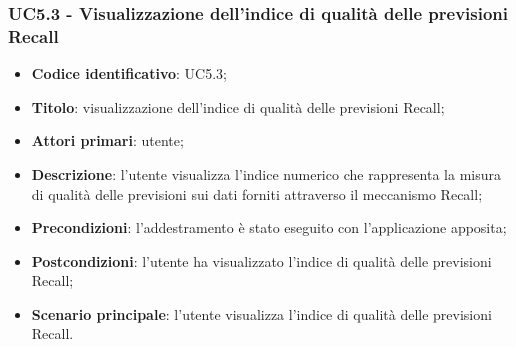 \subsubsection{UC5.3 - Visualizzazione dell'indice di qualità delle previsioni Recall}
\begin{itemize}
	\item \textbf{Codice identificativo}: UC5.3;
	\item \textbf{Titolo}: visualizzazione dell'indice di qualità delle previsioni Recall\glo;
	\item \textbf{Attori primari}: utente;
	\item \textbf{Descrizione}: l'utente visualizza l'indice numerico che rappresenta la misura di qualità delle previsioni sui dati forniti attraverso il meccanismo Recall\glo;
	\item \textbf{Precondizioni}: l'addestramento è stato eseguito con l'applicazione apposita;
	\item \textbf{Postcondizioni}: l'utente ha visualizzato l'indice di qualità delle previsioni Recall\glo;
	\item \textbf{Scenario principale}: l'utente visualizza l'indice di qualità delle previsioni Recall\glo.
\end{itemize} 
